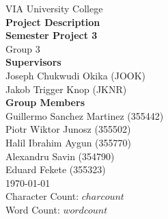 \thispagestyle{empty}
\vspace*{0.15\textheight}
\begin{center}
    {\Large VIA University College}\\[2em]
    {\huge \textbf{Project Description}}\\[0.5em]
    {\Large \textbf{Semester Project 3}}\\[0.5em]
    {\Large Group 3}\\[3em]
    {\large \textbf{Supervisors}}\\[0.5em]
    {\large Joseph Chukwudi Okika (JOOK)}\\[0.5em]
    {\large Jakob Trigger Knop (JKNR)}\\[2em]
    {\large \textbf{Group Members}}\\[0.5em]
    {\large Guillermo Sanchez Martinez (355442)}\\[0.5em]
    {\large Piotr Wiktor Junosz (355502)}\\[0.5em]
    {\large Halil Ibrahim Aygun (355770)}\\[0.5em]
    {\large Alexandru Savin (354790)}\\[0.5em]
    {\large Eduard Fekete (355323)}\\[2em]
    {\large \today}\\[1em]
    {\large Character Count: $charcount$}\\[0.5em]
    {\large Word Count: $wordcount$}
\end{center}
\vfill
\clearpage